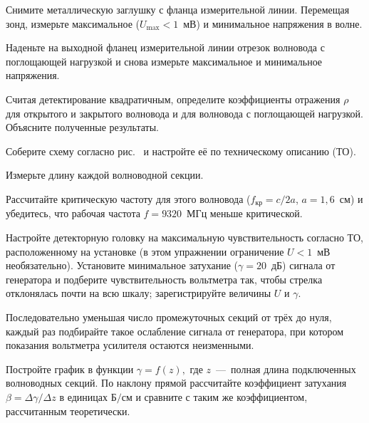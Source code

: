 \begin{lab:task}
    
    \item Снимите металлическую заглушку с фланца измерительной линии. Перемещая
    зонд, измерьте максимальное ($U_{\text{max}}<1$~мВ) и минимальное напряжения
    в волне.
    
    \item Наденьте на выходной фланец измерительной линии отрезок волновода с
    поглощающей нагрузкой и снова измерьте максимальное и минимальное напряжения.
    
    \item Считая детектирование квадратичным, определите коэффициенты отражения
    $\rho$ для открытого и закрытого волновода и для волновода с поглощающей
    нагрузкой. Объясните полученные результаты.
    
    
    \item Соберите схему согласно рис.~ и настройте её по
    техническому описанию (ТО).
    
    \item Измерьте длину каждой волноводной секции.
    
    \item Рассчитайте критическую частоту для этого волновода
    ($f_{\text{кр}}=c/2a$, $a=1,6$~см) и убедитесь, что рабочая частота
    $f=9320$~МГц меньше критической.
    
    
    \item Настройте детекторную головку на максимальную чувствительность согласно
    ТО, расположенному на установке (в этом упражнении ограничение $U<1$~мВ
    необязательно). Установите минимальное затухание ($\gamma=20$~дБ) сигнала от
    генератора и подберите чувствительность вольтметра так, чтобы стрелка
    отклонялась почти на всю шкалу; зарегистрируйте величины $U$ и $\gamma.$
    
    \item Последовательно уменьшая число промежуточных секций от трёх до нуля,
    каждый раз подбирайте такое ослабление сигнала от генератора, при котором
    показания вольтметра усилителя остаются неизменными.
    
    \item Постройте график в функции $\gamma=f(z),$ где $z$~---~полная длина
    подключенных волноводных секций. По наклону прямой рассчитайте коэффициент
    затухания $\beta=\Delta\gamma/\Delta z$ в единицах $\text{Б}/\text{см}$ и
    сравните с таким же коэффициентом, рассчитанным теоретически. \end{lab:task}


